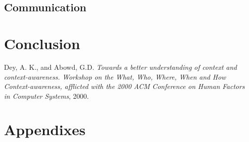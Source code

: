 \documentclass[]{report}
\begin{document}
\section{Communication}


\chapter{Conclusion}

\begin{thebibliography}{9}

  Dey, A. K., and Abowd, G.D.
  \emph{Towards a better understanding of context and context-awareness. Workshop on the What, Who, Where, When and How Context-awareness, afflicted with the 2000 ACM Conference on Human Factors in Computer Systems},
  2000.

\end{thebibliography}
\chapter{Appendixes}
\end{document}
